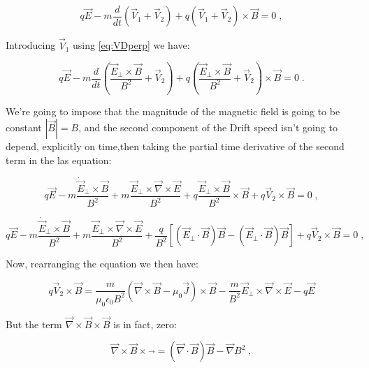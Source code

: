 \documentclass[spanish,notitlepage,letterpaper,11pt]{article} %
\numberwithin{equation}{subsection}
\begin{document}
    \begin{equation}
        q\Vec{E} - m\frac{d}{dt}(\Vec{V}_1 + \Vec{V}_2) + q(\Vec{V}_1 + \Vec{V}_2)\times \Vec{B} = 0\;,
    \end{equation}

    Introducing $\Vec{V}_1$ using \ref{eq:VDperp} we have: 

    \begin{equation}
        q\Vec{E} - m\frac{d}{dt}(\frac{\Vec{E}_\perp \times\Vec{B}}{B^2} + \Vec{V}_2) + q(\frac{\Vec{E}_\perp \times\Vec{B}}{B^2} + \Vec{V}_2)\times \Vec{B} = 0\;.
    \end{equation}

    We're going to impose that the magnitude of the magnetic field is going to be constant $|\Vec{B}| = B$, and the second component of the Drift speed isn't going to depend, explicitly on time,then taking the partial time derivative of the second term in the las equation:

    \begin{equation*}
        q\Vec{E} - m \frac{\Dot{\Vec{E}}_\perp\times \Vec{B}}{B^2} + m \frac{\Vec{E}_\perp \times \Vec{\nabla}\times\Vec{E}}{B^2} + q \frac{\Vec{E}_\perp \times \Vec{B}}{B^2}\times \Vec{B} + q\Vec{V}_2 \times \Vec{B} = 0\;,
    \end{equation*}

    \begin{equation*}
        q\Vec{E} - m \frac{\Dot{\Vec{E}}_\perp\times \Vec{B}}{B^2} + m \frac{\Vec{E}_\perp \times \Vec{\nabla}\times\Vec{E}}{B^2} + \frac{q}{B^2}\left[(\Vec{E}_\perp \cdot \Vec{B})\Vec{B} - (\Vec{E}_\perp \cdot \Vec{B})\Vec{B} \right] + q \Vec{V}_2\times\Vec{B} = 0\;,
    \end{equation*}

    Now, rearranging the equation we then have:

    \begin{equation}
        q\Vec{V}_2 \times \Vec{B} = \frac{m}{\mu_0\epsilon_0B^2}(\Vec{\nabla}\times\Vec{B} - \mu_0 \Vec{J})\times\Vec{B} - \frac{m}{B^2}\Vec{E}_\perp \times \Vec{\nabla} \times \Vec{E} - q\Vec{E}
    \end{equation}

    But the term $\Vec{\nabla}\times\Vec{B}\times\Vec{B}$ is in fact, zero:

    \begin{equation}
        \Vec{\nabla}\times\Vec{B}\times\Vec{} = (\Vec{\nabla}\cdot \Vec{B})\Vec{B} - \Vec{\nabla}B^2\;,
    \end{equation}
\end{document}
